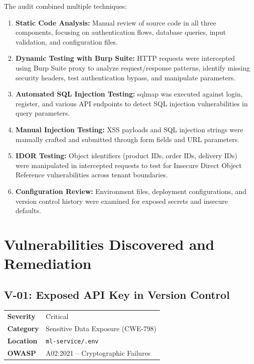 \documentclass[12pt,a4paper]{article}
\begin{document}
The audit combined multiple techniques:

\begin{enumerate}
  \item \textbf{Static Code Analysis:} Manual review of source code in all three components, focusing on authentication flows, database queries, input validation, and configuration files.
  \item \textbf{Dynamic Testing with Burp Suite:} HTTP requests were intercepted using Burp Suite proxy to analyze request/response patterns, identify missing security headers, test authentication bypass, and manipulate parameters.
  \item \textbf{Automated SQL Injection Testing:} sqlmap was executed against login, register, and various API endpoints to detect SQL injection vulnerabilities in query parameters.
  \item \textbf{Manual Injection Testing:} XSS payloads and SQL injection strings were manually crafted and submitted through form fields and URL parameters.
  \item \textbf{IDOR Testing:} Object identifiers (product IDs, order IDs, delivery IDs) were manipulated in intercepted requests to test for Insecure Direct Object Reference vulnerabilities across tenant boundaries.
  \item \textbf{Configuration Review:} Environment files, deployment configurations, and version control history were examined for exposed secrets and insecure defaults.
\end{enumerate}

\section{Vulnerabilities Discovered and Remediation}

\subsection{V-01: Exposed API Key in Version Control}

\begin{table}[H]
\centering
\begin{tabularx}{\textwidth}{lX}
\toprule
\textbf{Severity} & \textcolor{critical}{Critical} \\
\textbf{Category} & Sensitive Data Exposure (CWE-798) \\
\textbf{Location} & \texttt{ml-service/.env} \\
\textbf{OWASP} & A02:2021 -- Cryptographic Failures \\
\bottomrule
\end{tabularx}
\end{table}
\end{document}
